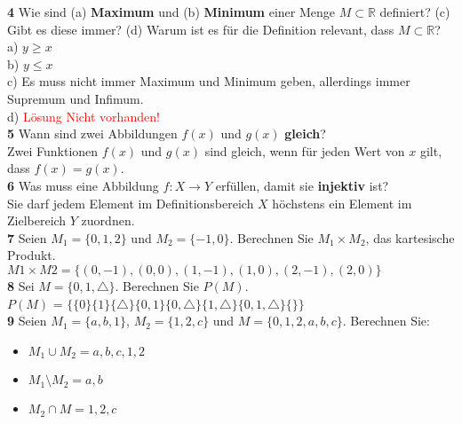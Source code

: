 \documentclass[11pt]{article}
\begin{document}
{{    \textbf{4} Wie sind (a) \textbf{Maximum} und (b) \textbf{Minimum} einer Menge $M \subset \mathbb{R}$ definiert? (c) Gibt es diese immer? (d) Warum ist es für die Definition relevant, dass $M \subset \mathbb{R}$?\\
    a) $y \geq x$\\
    b) $y \leq x$\\
    c) Es muss nicht immer Maximum und Minimum geben, allerdings immer Supremum und Infimum.\\
    d) \textcolor{red}{Lösung Nicht vorhanden!}\\

    \textbf{5} Wann sind zwei Abbildungen $f(x)$ und $g(x)$ \textbf{gleich}?\\
    Zwei Funktionen $f(x)$ und $g(x)$ sind gleich, wenn für jeden Wert von $x$ gilt, dass $f(x) = g(x)$.\\

    \textbf{6} Was muss eine Abbildung $f : X \rightarrow Y $ erfüllen, damit sie \textbf{injektiv} ist?\\
    Sie darf jedem Element im Definitionsbereich $X$ höchstens ein Element im Zielbereich $Y$ zuordnen.\\

    \textbf{7} Seien $ M_1 = \{0,1,2\} $ und $ M_2 = \{-1, 0\} $. Berechnen Sie $ M_1 \times M_2 $, das kartesische Produkt.\\
    $M1 \times M2 = \{(0,-1),(0,0),(1,-1),(1,0),(2,-1),(2,0)\}$ \\

    \textbf{8} Sei $ M = \{0, 1, \triangle\} $. Berechnen Sie $ P(M) $.\\
    $ P(M) $ = $\{\{0\}\{1\}\{\triangle\}\{0,1\}\{0,\triangle\}\{1,\triangle\}\{0,1,\triangle\}\{\}\}$\\

    \textbf{9} Seien $ M_1 = \{a, b, 1\} $, $ M_2 = \{1, 2, c\} $ und $ M = \{0, 1, 2, a, b, c\} $. Berechnen Sie:
    \begin{itemize}
        \item $ M_1 \cup M_2 = {a,b,c,1,2}$
        \item $ M_1 \setminus M_2 = {a,b}$
        \item $ M_2 \cap M = {1,2,c}$
    \end{itemize}\\

}}
\end{document}
